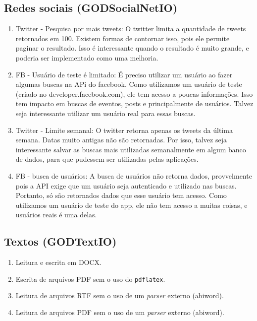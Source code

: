 \subsection{Redes sociais (GODSocialNetIO)}
\begin{enumerate}
\item Twitter - Pesquisa por mais tweets: O twitter limita a quantidade de tweets retornados em 100. Existem formas de contornar isso, pois ele permite paginar o resultado. Isso é interessante quando o resultado é muito grande, e poderia ser implementado como uma melhoria.
\item FB - Usuário de teste é limitado: É preciso utilizar um usuário ao fazer algumas buscas na APi do facebook. Como utilizamos um usuário de teste (criado no developer.facebook.com), ele tem acesso a poucas informações. Isso tem impacto em buscas de eventos, posts e principalmente de usuários. Talvez seja interessante utilizar um usuário real para essas buscas.
\item Twitter - Limite semanal: O twitter retorna apenas os tweets da última semana. Datas muito antigas não são retornadas. Por isso, talvez seja interessante salvar as buscas mais utilizadas semanalmente em algum banco de dados, para que pudessem ser utilizadas pelas aplicações.
\item FB - busca de usuários: A busca de usuários não retorna dados, provvelmente pois a API exige que um usuário seja autenticado e utilizado nas buscas. Portanto, só são retornados dados que esse usuário tem acesso. Como utilizamos um usuário de teste do app, ele não tem acesso a muitas coisas, e usuários reais é uma delas.
\end{enumerate}

\subsection{Textos (GODTextIO)}
\begin{enumerate}
\item Leitura e escrita em DOCX.
\item Escrita de arquivos PDF sem o uso do \verb|pdflatex|.
\item Leitura de arquivos RTF sem o uso de um \textit{parser} externo (abiword).
\item Leitura de arquivos PDF sem o uso de um \textit{parser} externo (abiword).
\end{enumerate}

